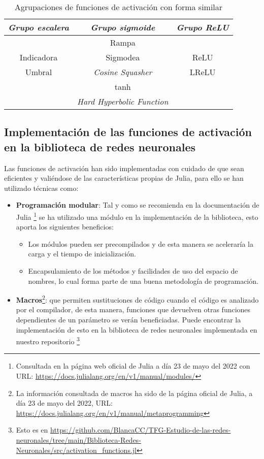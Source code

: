 \begin{table}[H] 
    \centering  
    \begin{tabular}{| c | c | c | }
        \hline
        \textit{Grupo escalera} & \textit{Grupo sigmoide} & \textit{Grupo ReLU} \\
        \hline
       &  Rampa &  \\
       Indicadora & Sigmodea & ReLU\\
       Umbral & \textit{Cosine Squasher}& LReLU\\
        & tanh & \\
        & \textit{Hard Hyperbolic Function}& \\
\hline
    \end{tabular}
    \caption{Agrupaciones de funciones de activación con forma similar}  
    \label{table:Clases-equivalencia-activation-function}
\end{table}

\subsection{ Implementación de las funciones de activación en la biblioteca de redes neuronales} 

Las funciones de activación han sido implementadas con cuidado de que sean eficientes 
y valiéndose de las características propias de Julia, para ello se han utilizado técnicas como: 

\begin{itemize}
    \item \textbf{Programación modular}: Tal y como se recomienda en la documentación de Julia \footnote{
        Consultada en la página web oficial de Julia  a día 23 de mayo del 2022 con URL: \url{https://docs.julialang.org/en/v1/manual/modules/}
    } se ha utilizado una módulo en la implementación de la biblioteca, esto aporta los siguientes beneficios: 
    \begin{itemize}
        \item Los módulos pueden ser precompilados y de esta manera se aceleraría la carga y el tiempo de inicialización. 
        \item Encapsulamiento de los métodos y facilidades de uso del espacio de nombres, lo cual forma parte
        de una buena metodología de programación. 
    \end{itemize}
    \item \textbf{Macros}\footnote{La información consultada de macros ha sido  de la página oficial de Julia, a día 23 de mayo del 2022, URL:
    \url{https://docs.julialang.org/en/v1/manual/metaprogramming}}:
    que permiten sustituciones de código cuando el código es analizado por el compilador, 
    de esta manera, funciones que devuelven otras funciones dependientes de un parámetro se verán beneficiadas. 
     Puede encontrar la implementación de esto en la biblioteca de redes neuronales implementada en nuestro 
     repositorio \footnote{Esto es en \url{https://github.com/BlancaCC/TFG-Estudio-de-las-redes-neuronales/tree/main/Biblioteca-Redes-Neuronales/src/activation_functions.jl}}
\end{itemize}




